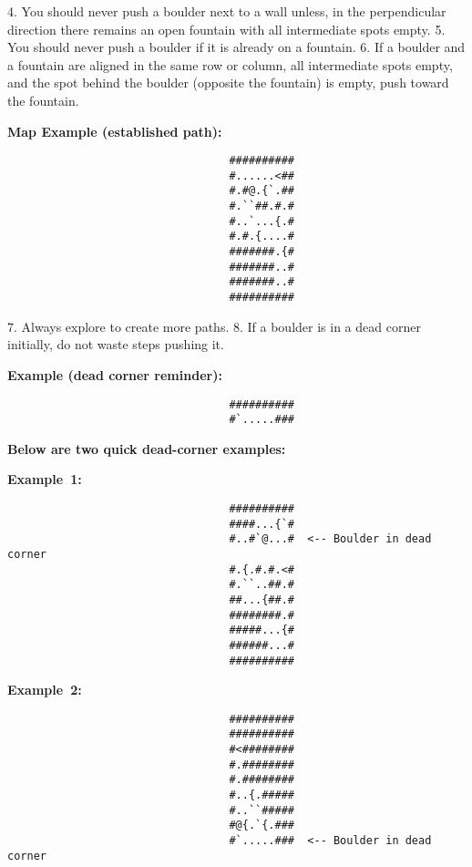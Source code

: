 \begin{MyGreenBox}
{	4. You should never push a boulder next to a wall unless, in the perpendicular direction there remains an open fountain with all intermediate spots empty. 5. You should never push a boulder if it is already on a fountain. 6. If a boulder and a fountain are aligned in the same row or column, all intermediate spots empty, and the spot behind the boulder (opposite the fountain) is empty, push toward the fountain.

	\textbf{Map Example (established path):} \begin{verbatim}
                                  ##########
                                  #......<##
                                  #.#@.{`.##
                                  #.``##.#.#
                                  #..`...{.#
                                  #.#.{....#
                                  #######.{#
                                  #######..#
                                  #######..#
                                  ##########
\end{verbatim}

	7. Always explore to create more paths. 8. If a boulder is in a dead corner initially, do not waste steps pushing it.

	\textbf{Example (dead corner reminder):} \begin{verbatim}
                                  ##########
                                  #`.....###
\end{verbatim}

	\textbf{Below are two quick dead-corner examples:}

	\textbf{Example 1:} \begin{verbatim}
                                  ##########
                                  ####...{`#
                                  #..#`@...#  <-- Boulder in dead corner
                                  #.{.#.#.<#
                                  #.``..##.#
                                  ##...{##.#
                                  ########.#
                                  #####...{#
                                  ######...#
                                  ##########
\end{verbatim}

	\textbf{Example 2:} \begin{verbatim}
                                  ##########
                                  ##########
                                  #<########
                                  #.########
                                  #.########
                                  #..{.#####
                                  #..``#####
                                  #@{.`{.###
                                  #`.....###  <-- Boulder in dead corner
\end{verbatim}

}
\end{MyGreenBox}
